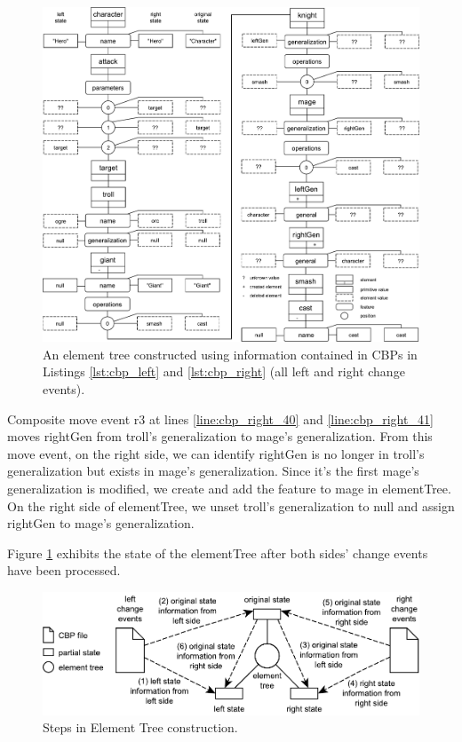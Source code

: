 \begin{figure}[ht]
  \centering
  \includegraphics[width=\linewidth]{element_tree_game_right}
  \caption{An element tree constructed using information contained in CBPs in Listings \ref{lst:cbp_left} and \ref{lst:cbp_right} (all left and right change events).}
  \label{fig:right_element_tree_diagram}
\end{figure} 

Composite move event \textsf{r3} at lines \ref{line:cbp_right_40} and \ref{line:cbp_right_41} moves \textsf{rightGen} from \textsf{troll}'s \textsf{generalization} to \textsf{mage}'s \textsf{generalization}. From this move event, on the right side, we can identify \textsf{rightGen} is no longer in \textsf{troll}'s \textsf{generalization} but exists in \textsf{mage}'s \textsf{generalization}. Since it's the first \textsf{mage}'s \textsf{generalization} is modified, we create and add the feature to \textsf{mage} in \textsf{elementTree}. On the right side of \textsf{elementTree}, we unset \textsf{troll}'s \textsf{generalization} to null and assign \textsf{rightGen} to \textsf{mage}'s \textsf{generalization}.

Figure \ref{fig:right_element_tree_diagram} exhibits the state of the \textsf{elementTree} after both sides' change events have been processed.

\begin{figure}
  \centering
  \includegraphics[width=\linewidth]{TreeConstruction}
  \caption{Steps in Element Tree construction.}
  \label{fig:tree_construction}
\end{figure} 

